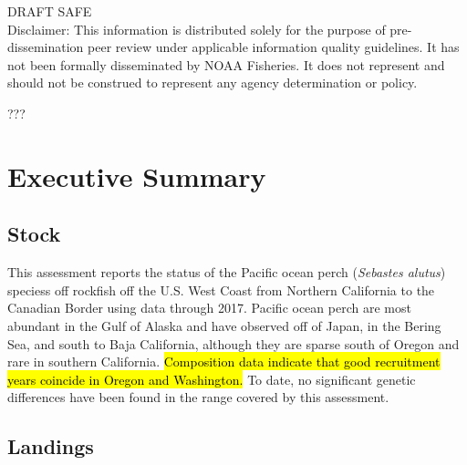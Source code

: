 \documentclass[12pt,]{article}
\begin{document}
\begin{center}
\vfill
DRAFT SAFE\\
Disclaimer: This information is distributed solely for the purpose of pre-dissemination
peer review under applicable information quality guidelines. It has not been formally
disseminated by NOAA Fisheries. It does not represent and should not be construed to
represent any agency determination or policy. 

\vspace{.3cm}

\maketitle

\setcounter{page}{1}
\end{center}

{
\setcounter{tocdepth}{4}
\tableofcontents
}
\setlength{\parskip}{5mm plus1mm minus1mm} \pagebreak

 \setcounter{page}{1}
\renewcommand{\thefigure}{\alph{figure}}
???\renewcommand{\thetable}{\alph{table}}

\section*{Executive Summary}\label{executive-summary}

\subsection*{Stock}\label{stock}

This assessment reports the status of the Pacific ocean perch
(\emph{Sebastes alutus}) speciess off rockfish off the U.S. West Coast
from Northern California to the Canadian Border using data through 2017.
Pacific ocean perch are most abundant in the Gulf of Alaska and have
observed off of Japan, in the Bering Sea, and south to Baja California,
although they are sparse south of Oregon and rare in southern
California. \hl{Composition data indicate that
good recruitment years coincide in Oregon and Washington.} To date, no
significant genetic differences have been found in the range covered by
this assessment.

\subsection*{Landings}\label{landings}
\end{document}
